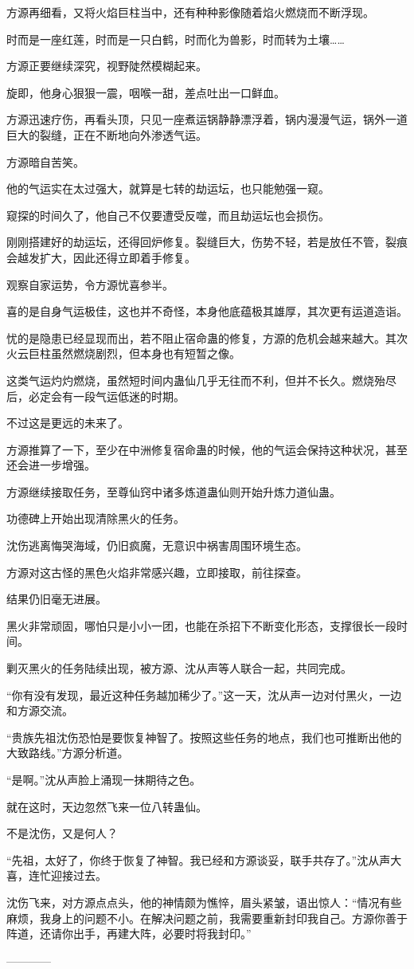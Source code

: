 \begin{this_body}
方源再细看，又将火焰巨柱当中，还有种种影像随着焰火燃烧而不断浮现。

时而是一座红莲，时而是一只白鹤，时而化为兽影，时而转为土壤……

方源正要继续深究，视野陡然模糊起来。

旋即，他身心狠狠一震，咽喉一甜，差点吐出一口鲜血。

方源迅速疗伤，再看头顶，只见一座煮运锅静静漂浮着，锅内漫漫气运，锅外一道巨大的裂缝，正在不断地向外渗透气运。

方源暗自苦笑。

他的气运实在太过强大，就算是七转的劫运坛，也只能勉强一窥。

窥探的时间久了，他自己不仅要遭受反噬，而且劫运坛也会损伤。

刚刚搭建好的劫运坛，还得回炉修复。裂缝巨大，伤势不轻，若是放任不管，裂痕会越发扩大，因此还得立即着手修复。

观察自家运势，令方源忧喜参半。

喜的是自身气运极佳，这也并不奇怪，本身他底蕴极其雄厚，其次更有运道造诣。

忧的是隐患已经显现而出，若不阻止宿命蛊的修复，方源的危机会越来越大。其次火云巨柱虽然燃烧剧烈，但本身也有短暂之像。

这类气运灼灼燃烧，虽然短时间内蛊仙几乎无往而不利，但并不长久。燃烧殆尽后，必定会有一段气运低迷的时期。

不过这是更远的未来了。

方源推算了一下，至少在中洲修复宿命蛊的时候，他的气运会保持这种状况，甚至还会进一步增强。

方源继续接取任务，至尊仙窍中诸多炼道蛊仙则开始升炼力道仙蛊。

功德碑上开始出现清除黑火的任务。

沈伤逃离悔哭海域，仍旧疯魔，无意识中祸害周围环境生态。

方源对这古怪的黑色火焰非常感兴趣，立即接取，前往探查。

结果仍旧毫无进展。

黑火非常顽固，哪怕只是小小一团，也能在杀招下不断变化形态，支撑很长一段时间。

剿灭黑火的任务陆续出现，被方源、沈从声等人联合一起，共同完成。

“你有没有发现，最近这种任务越加稀少了。”这一天，沈从声一边对付黑火，一边和方源交流。

“贵族先祖沈伤恐怕是要恢复神智了。按照这些任务的地点，我们也可推断出他的大致路线。”方源分析道。

“是啊。”沈从声脸上涌现一抹期待之色。

就在这时，天边忽然飞来一位八转蛊仙。

不是沈伤，又是何人？

“先祖，太好了，你终于恢复了神智。我已经和方源谈妥，联手共存了。”沈从声大喜，连忙迎接过去。

沈伤飞来，对方源点点头，他的神情颇为憔悴，眉头紧皱，语出惊人：“情况有些麻烦，我身上的问题不小。在解决问题之前，我需要重新封印我自己。方源你善于阵道，还请你出手，再建大阵，必要时将我封印。”

------------

\end{this_body}

